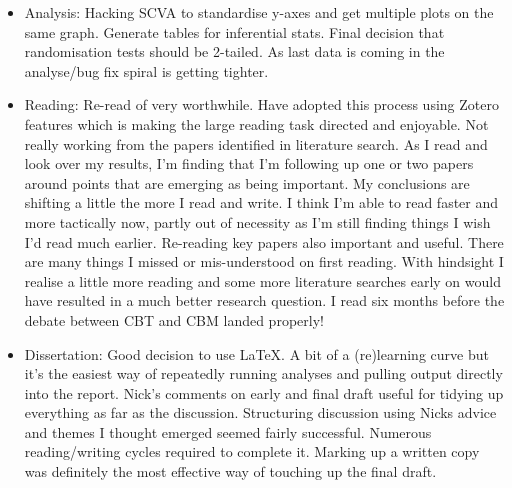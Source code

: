 \documentclass[british]{article}
\begin{document}
\begin{itemize}
  \item Analysis: Hacking SCVA to standardise y-axes and get multiple
  plots on the same graph. Generate tables for inferential stats. Final
  decision that randomisation tests should be 2-tailed. As last data is coming
  in the analyse/bug fix spiral is getting tighter.

  \item Reading: Re-read of \textcite{shon_how_2012} very worthwhile. Have
  adopted this process using Zotero features which is making the large
  reading task directed and enjoyable. Not really working from the papers
  identified in literature search. As I read and look over my results,
  I'm finding that I'm following up one or two papers around points that
  are emerging as being important. My conclusions are shifting a little
  the more I read and write. I think I'm able to read faster and more
  tactically now, partly out of necessity as I'm still finding things
  I wish I'd read much earlier.  Re-reading key papers also important
  and useful. There are many things I missed or mis-understood on first
  reading. With hindsight I realise a little more reading and some more
  literature searches early on would have resulted in a much better
  research question. I read \textcite{cristea_efficacy_2015} six months
  before the debate between CBT and CBM landed properly!

  \item Dissertation: Good decision to use LaTeX. A bit of a (re)learning
  curve but it's the easiest way of repeatedly running analyses and
  pulling output directly into the report. Nick's comments on  early
  and final draft useful for tidying up everything as far as the
  discussion. Structuring discussion using Nicks advice and themes I
  thought emerged seemed fairly successful.  Numerous reading/writing
  cycles required to complete it. Marking up a written copy was definitely
  the most effective way of touching up the final draft.
\end{itemize}

\printbibliography
\end{document}

